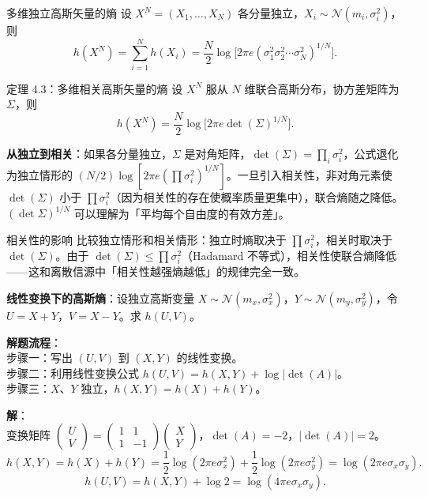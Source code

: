 \begin{theoremBox}{多维独立高斯矢量的熵}
设 $X^N=(X_1,\dots,X_N)$ 各分量独立，$X_i\sim\mathcal{N}(m_i,\sigma_i^2)$，则
\[
h(X^N)=\sum_{i=1}^N h(X_i)=\frac{N}{2}\log\bigl[2\pi e(\sigma_1^2\sigma_2^2\cdots\sigma_N^2)^{1/N}\bigr].
\]
\end{theoremBox}

\begin{theoremBox}{定理 4.3：多维相关高斯矢量的熵}
设 $X^N$ 服从 $N$ 维联合高斯分布，协方差矩阵为 $\Sigma$，则
\[
h(X^N)=\frac{N}{2}\log\bigl[2\pi e\det(\Sigma)^{1/N}\bigr].
\]

\noindent \textbf{从独立到相关}：如果各分量独立，$\Sigma$ 是对角矩阵，$\det(\Sigma)=\prod_i\sigma_i^2$，公式退化为独立情形的 $(N/2)\log[2\pi e(\prod\sigma_i^2)^{1/N}]$。一旦引入相关性，非对角元素使 $\det(\Sigma)$ 小于 $\prod\sigma_i^2$（因为相关性的存在使概率质量更集中），联合熵随之降低。$(\det\Sigma)^{1/N}$ 可以理解为「平均每个自由度的有效方差」。
\end{theoremBox}

\begin{keypoint}{相关性的影响}
比较独立情形和相关情形：独立时熵取决于 $\prod\sigma_i^2$，相关时取决于 $\det(\Sigma)$。由于 $\det(\Sigma)\le\prod\sigma_i^2$（Hadamard 不等式），相关性使联合熵降低——这和离散信源中「相关性越强熵越低」的规律完全一致。
\end{keypoint}

\begin{example}
\label{ex:gauss-linear-transform}
\textbf{线性变换下的高斯熵}：设独立高斯变量 $X\sim\mathcal{N}(m_x,\sigma_x^2)$，$Y\sim\mathcal{N}(m_y,\sigma_y^2)$，令 $U=X+Y$，$V=X-Y$。求 $h(U,V)$。

\noindent \textbf{解题流程}：\\[2pt]
步骤一：写出 $(U,V)$ 到 $(X,Y)$ 的线性变换。\\
步骤二：利用线性变换公式 $h(U,V)=h(X,Y)+\log|\det(A)|$。\\
步骤三：$X$、$Y$ 独立，$h(X,Y)=h(X)+h(Y)$。

\noindent \textbf{解}：\\[2pt]
变换矩阵 $\begin{pmatrix}U\\V\end{pmatrix}=\begin{pmatrix}1&1\\1&-1\end{pmatrix}\begin{pmatrix}X\\Y\end{pmatrix}$，$\det(A)=-2$，$|\det(A)|=2$。
\[
h(X,Y)=h(X)+h(Y)=\frac{1}{2}\log(2\pi e\sigma_x^2)+\frac{1}{2}\log(2\pi e\sigma_y^2)=\log(2\pi e\sigma_x\sigma_y).
\]
\[
h(U,V)=h(X,Y)+\log 2=\log(4\pi e\sigma_x\sigma_y).
\]
\end{example}

